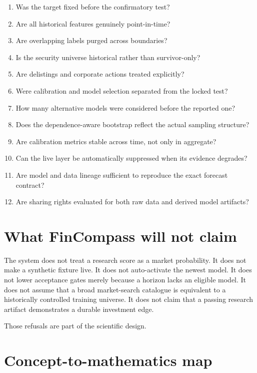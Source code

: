 \documentclass[11pt]{article}
\begin{document}
\begin{enumerate}
\item Was the target fixed before the confirmatory test?
\item Are all historical features genuinely point-in-time?
\item Are overlapping labels purged across boundaries?
\item Is the security universe historical rather than survivor-only?
\item Are delistings and corporate actions treated explicitly?
\item Were calibration and model selection separated from the locked test?
\item How many alternative models were considered before the reported one?
\item Does the dependence-aware bootstrap reflect the actual sampling structure?
\item Are calibration metrics stable across time, not only in aggregate?
\item Can the live layer be automatically suppressed when its evidence degrades?
\item Are model and data lineage sufficient to reproduce the exact forecast contract?
\item Are sharing rights evaluated for both raw data and derived model artifacts?
\end{enumerate}

\section{What FinCompass will not claim}

The system does not treat a research score as a market probability. It does not make a synthetic fixture live. It does not auto-activate the newest model. It does not lower acceptance gates merely because a horizon lacks an eligible model. It does not assume that a broad market-search catalogue is equivalent to a historically controlled training universe. It does not claim that a passing research artifact demonstrates a durable investment edge.

Those refusals are part of the scientific design.

\section{Concept-to-mathematics map}
\end{document}
